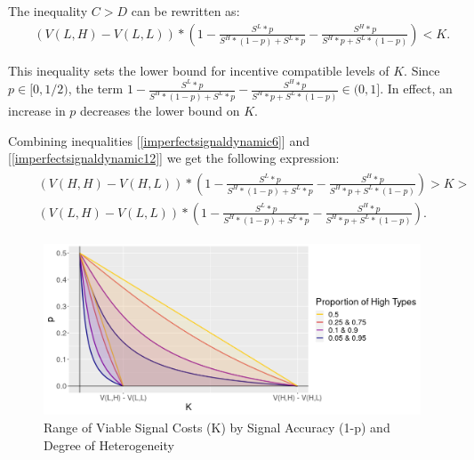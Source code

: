 The inequality $C>D$ can be rewritten as:
\begin{eqnarray}
&& (V(L,H) - V(L,L))*(1-\frac{S^L*p}{S^H*(1-p)+S^L*p}-\frac{S^H*p}{S^H*p+S^L*(1-p)}) < K. \label{imperfectsignaldynamic12}
\end{eqnarray}

This inequality sets the lower bound for incentive compatible levels of $K$. Since $p \in [0,1/2)$, the term $1-\frac{S^L*p}{S^H*(1-p)+S^L*p}-\frac{S^H*p}{S^H*p+S^L*(1-p)}\in (0,1]$. In effect, an increase in $p$ decreases the lower bound on $K$. 

Combining inequalities [\ref{imperfectsignaldynamic6}] and [\ref{imperfectsignaldynamic12}] we get the following expression:
\begin{eqnarray}
&& 
\begin{split}
(V(H,H) - V(H,L))*(1-\frac{S^L*p}{S^H*(1-p)+S^L*p}-\frac{S^H*p}{S^H*p+S^L*(1-p)}) > K > \\
(V(L,H) - V(L,L))*(1-\frac{S^L*p}{S^H*(1-p)+S^L*p}-\frac{S^H*p}{S^H*p+S^L*(1-p)}).
\end{split}
\label{imperfectsignaldynamic13}
\end{eqnarray}


 
 \begin{figure}[h]
   \caption{Range of Viable Signal Costs (K) by Signal Accuracy (1-p) and Degree of Heterogeneity}
   \label{fig:ViableK}
    \includegraphics[width=\textwidth, height=.28\textheight]{Images/ViableK2.png}
    \end{figure}
 
